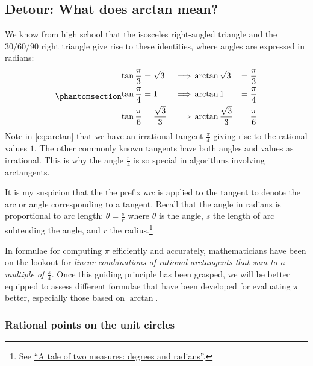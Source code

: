 \documentclass[
  a4paper,
]{article}
\begin{document}
\subsection{Detour: What does arctan
mean?}\label{detour-what-does-arctan-mean}

We know from high school that the isosceles right-angled triangle and
the 30/60/90 right triangle give rise to these identities, where angles
are expressed in radians:
\begin{equation}\phantomsection\label{eq:arctan}{
\begin{aligned}
\tan\frac{\pi}{3} &= \sqrt{3} &\implies &\arctan\sqrt{3} &= \frac{\pi}{3}\\
\tan\frac{\pi}{4} &= 1 &\implies &\arctan 1 &= \frac{\pi}{4}\\
\tan\frac{\pi}{6} &= \frac{\sqrt{3}}{3} &\implies &\arctan\frac{\sqrt{3}}{3} &= \frac{\pi}{6}\\
\end{aligned}
}\end{equation} Note in \cref{eq:arctan} that we have an irrational
tangent \(\frac{\pi}{4}\) giving rise to the rational values \(1\). The
other commonly known tangents have both angles and values as irrational.
This is why the angle \(\frac{\pi}{4}\) is so special in algorithms
involving arctangents.

It is my suspicion that the the prefix \emph{arc} is applied to the
tangent to denote the arc or angle corresponding to a tangent. Recall
that the angle in radians is proportional to arc length:
\(\theta = \frac{s}{r}\) where \(\theta\) is the angle, \(s\) the length
of arc subtending the angle, and \(r\) the radius.\footnote{See
  \href{https://swanlotus.netlify.app/blogs/a-tale-of-two-measures-degrees-and-radians}{``A
  tale of two measures: degrees and radians''}.}

In formulae for computing \(\pi\) efficiently and accurately,
mathematicians have been on the lookout for \emph{linear combinations of
rational arctangents that sum to a multiple of \(\frac{\pi}{4}\)}. Once
this guiding principle has been grasped, we will be better equipped to
assess different formulae that have been developed for evaluating
\(\pi\) better, especially those based on \(\arctan\).

\subsubsection{Rational points on the unit
circles}\label{rational-points-on-the-unit-circles}
\end{document}
